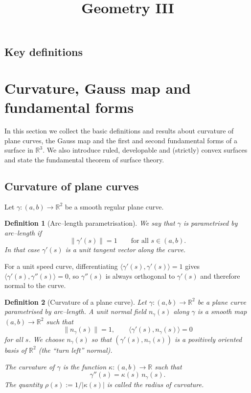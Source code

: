 \documentclass[12pt,a4paper]{article}
\title{Geometry III}
\author{}
\date{}
\theoremstyle{plain}
\newtheorem{definition}{Definition}
\theoremstyle{definition}      %
\begin{document}
	\maketitle
	

\subsection*{Key definitions}

\section{Curvature, Gauss map and fundamental forms}

In this section we collect the basic definitions and results about
curvature of plane curves, the Gauss map and the first and second
fundamental forms of a surface in $\mathbb{R}^3$.  We also introduce
ruled, developable and (strictly) convex surfaces and state the
fundamental theorem of surface theory.

\subsection{Curvature of plane curves}

Let $\gamma:(a,b)\to\mathbb{R}^2$ be a smooth regular plane curve.

\begin{definition}[Arc--length parametrisation]
	We say that $\gamma$ is \emph{parametrised by arc--length} if
	\[
	\|\gamma'(s)\|=1\qquad\text{for all }s\in(a,b).
	\]
	In that case $\gamma'(s)$ is a unit tangent vector along the curve.
\end{definition}

For a unit speed curve, differentiating
$\langle\gamma'(s),\gamma'(s)\rangle=1$ gives
$\langle\gamma'(s),\gamma''(s)\rangle=0$, so $\gamma''(s)$ is always
orthogonal to $\gamma'(s)$ and therefore normal to the curve.

\begin{definition}[Curvature of a plane curve]
	Let $\gamma:(a,b)\to\mathbb{R}^2$ be a plane curve parametrised by
	arc--length.  A \emph{unit normal field} $n_\gamma(s)$ along $\gamma$
	is a smooth map $(a,b)\to\mathbb{R}^2$ such that
	\[
	\|n_\gamma(s)\|=1,\qquad
	\langle\gamma'(s),n_\gamma(s)\rangle=0
	\]
	for all $s$.  We choose $n_\gamma(s)$ so that
	$(\gamma'(s),n_\gamma(s))$ is a positively oriented basis of
	$\mathbb{R}^2$ (the ``turn left'' normal).
	
	The \emph{curvature} of $\gamma$ is the function
	$\kappa:(a,b)\to\mathbb{R}$ such that
	\[
	\gamma''(s) = \kappa(s)\,n_\gamma(s).
	\]
	The quantity $\rho(s):=1/|\kappa(s)|$ is called the \emph{radius of
		curvature}.
\end{definition}
\end{document}
